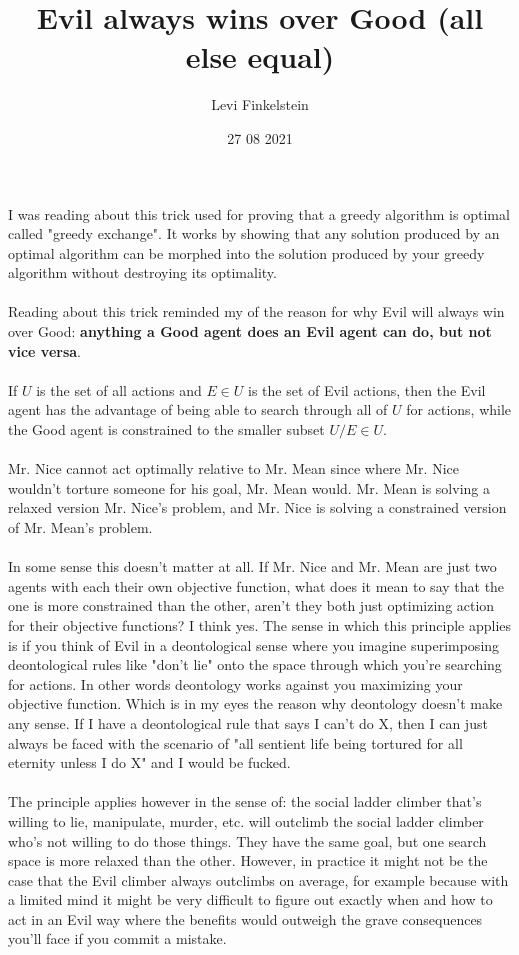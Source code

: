 \usepackage{pgfplots}
\title{Evil always wins over Good (all else equal)}
\author{Levi Finkelstein}
\date{27 08 2021}

\maketitle

I was reading about this trick used for proving that a greedy algorithm is optimal called "greedy exchange". It works by showing that any solution produced by an optimal algorithm can be morphed into the solution produced by your greedy algorithm without destroying its optimality.
\\\\
Reading about this trick reminded my of the reason for why Evil will always win over Good: \textbf{anything a Good agent does an Evil agent can do, but not vice versa}.
\\\\
If $U$ is the set of all actions and $E\in U$ is the set of Evil actions, then the Evil agent has the advantage of being able to search through all of $U$ for actions, while the Good agent is constrained to the smaller subset $U/E\in U$. 
\\\\
Mr. Nice cannot act optimally relative to Mr. Mean since where Mr. Nice wouldn't torture someone for his goal, Mr. Mean would. Mr. Mean is solving a relaxed version Mr. Nice's problem, and Mr. Nice is solving a constrained version of Mr. Mean's problem.
\\\\
In some sense this doesn't matter at all. If Mr. Nice and Mr. Mean are just two agents with each their own objective function, what does it mean to say that the one is more constrained than the other, aren't they both just optimizing action for their objective functions? I think yes. The sense in which this principle applies is if you think of Evil in a deontological sense where you imagine superimposing deontological rules like "don't lie" onto the space through which you're searching for actions. In other words deontology works against you maximizing your objective function. Which is in my eyes the reason why deontology doesn't make any sense. If I have a deontological rule that says I can't do X, then I can just always be faced with the scenario of "all sentient life being tortured for all eternity unless I do X" and I would be fucked.
\\\\
The principle applies however in the sense of: the social ladder climber that's willing to lie, manipulate, murder, etc. will outclimb the social ladder climber who's not willing to do those things. They have the same goal, but one search space is more relaxed than the other. However, in practice it might not be the case that the Evil climber always outclimbs on average, for example because with a limited mind it might be very difficult to figure out exactly when and how to act in an Evil way where the benefits would outweigh the grave consequences you'll face if you commit a mistake.

